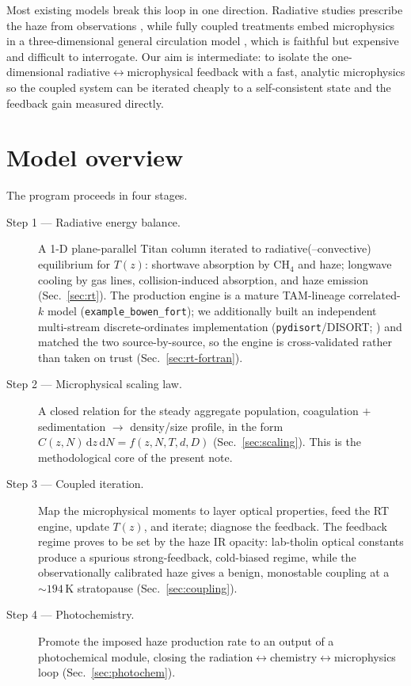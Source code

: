 \documentclass[11pt]{article}
\newcommand{\Df}{D}
\newcommand{\dd}{\mathrm{d}}
\begin{document}
Most existing models break this loop in one direction. Radiative studies
prescribe the haze from observations \citep{Tomasko2008heat,Lombardo2023}, while
fully coupled treatments embed microphysics in a three-dimensional general
circulation model \citep{deTrenquelleon2025}, which is faithful but expensive and
difficult to interrogate. Our aim is intermediate: to isolate the
one-dimensional radiative$\leftrightarrow$microphysical feedback with a fast,
analytic microphysics so the coupled system can be iterated cheaply to a
self-consistent state and the feedback gain measured directly.

\section{Model overview}
\label{sec:overview}

The program proceeds in four stages.

\begin{description}
  \item[Step 1 --- Radiative energy balance.] A 1-D plane-parallel Titan column
    iterated to radiative(--convective) equilibrium for $T(z)$: shortwave
    absorption by $\mathrm{CH_4}$ and haze; longwave cooling by gas lines,
    collision-induced absorption, and haze emission (Sec.~\ref{sec:rt}). The
    production engine is a mature TAM-lineage correlated-$k$ model
    (\texttt{example\_bowen\_fort}); we additionally built an independent
    multi-stream discrete-ordinates implementation
    (\texttt{pydisort}/DISORT; \citealp{Stamnes1988}) and matched the two
    source-by-source, so the engine is cross-validated rather than taken on
    trust (Sec.~\ref{sec:rt-fortran}).
  \item[Step 2 --- Microphysical scaling law.] A closed relation for the
    steady aggregate population, coagulation $+$ sedimentation
    $\to$ density/size profile, in the form $C(z,N)\,\dd z\,\dd N=f(z,N,T,d,\Df)$
    (Sec.~\ref{sec:scaling}). This is the methodological core of the present
    note.
  \item[Step 3 --- Coupled iteration.] Map the microphysical moments to layer
    optical properties, feed the RT engine, update $T(z)$, and iterate; diagnose
    the feedback. The feedback regime proves to be set by the haze IR opacity:
    lab-tholin optical constants produce a spurious strong-feedback, cold-biased
    regime, while the observationally calibrated haze gives a benign, monostable
    coupling at a $\sim\!194\,\mathrm{K}$ stratopause (Sec.~\ref{sec:coupling}).
  \item[Step 4 --- Photochemistry.] Promote the imposed haze production rate to
    an output of a photochemical module, closing the
    radiation$\leftrightarrow$chemistry$\leftrightarrow$microphysics loop
    (Sec.~\ref{sec:photochem}).
\end{description}
\end{document}
